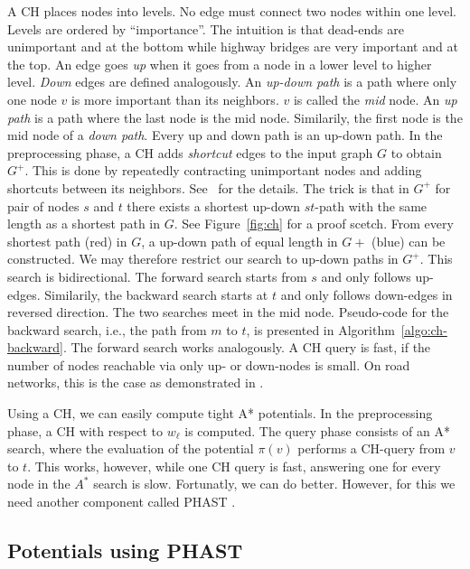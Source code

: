 \documentclass[letterpaper]{article} %
\begin{document}
A CH places nodes into levels.
No edge must connect two nodes within one level.
Levels are ordered by ``importance''.
The intuition is that dead-ends are unimportant and at the bottom while highway bridges are very important and at the top.
An edge goes \emph{up} when it goes from a node in a lower level to higher level.
\emph{Down} edges are defined analogously.
An \emph{up-down path} is a path where only one node $v$ is more important than its neighbors.
$v$ is called the \emph{mid} node.
An \emph{up path} is a path where the last node is the mid node.
Similarily, the first node is the mid node of a \emph{down path}.
Every up and down path is an up-down path.
%
In the preprocessing phase, a CH adds \emph{shortcut} edges to the input graph $G$ to obtain $G^+$.
This is done by repeatedly contracting unimportant nodes and adding shortcuts between its neighbors.
See~\cite{gssv-erlrn-12} for the details.
The trick is that in $G^+$ for pair of nodes $s$ and $t$ there exists a shortest up-down $st$-path with the same length as a shortest path in $G$.
See Figure~\ref{fig:ch} for a proof scetch.
From every shortest path (red) in $G$, a up-down path of equal length in $G+$ (blue) can be constructed.
We may therefore restrict our search to up-down paths in $G^+$.
This search is bidirectional.
The forward search starts from $s$ and only follows up-edges.
Similarily, the backward search starts at $t$ and only follows down-edges in reversed direction.
The two searches meet in the mid node.
Pseudo-code for the backward search, i.e., the path from $m$ to $t$, is presented in Algorithm~\ref{algo:ch-backward}.
The forward search works analogously.
%
A CH query is fast, if the number of nodes reachable via only up- or down-nodes is small.
On road networks, this is the case as demonstrated in \cite{gssv-erlrn-12,dgrw-gpnc-11,dgpw-crprn-13,dsw-cch-15,hs-gbpo-18}.

Using a CH, we can easily compute tight A* potentials.
In the preprocessing phase, a CH with respect to $w_\ell$ is computed.
The query phase consists of an A* search, where the evaluation of the potential $\pi(v)$ performs a CH-query from $v$ to $t$.
%
This works, however, while one CH query is fast, answering one for every node in the $A^*$ search is slow.
Fortunatly, we can do better.
However, for this we need another component called PHAST \cite{dgnw-phast-13}.

\subsection{Potentials using PHAST}
\end{document}

